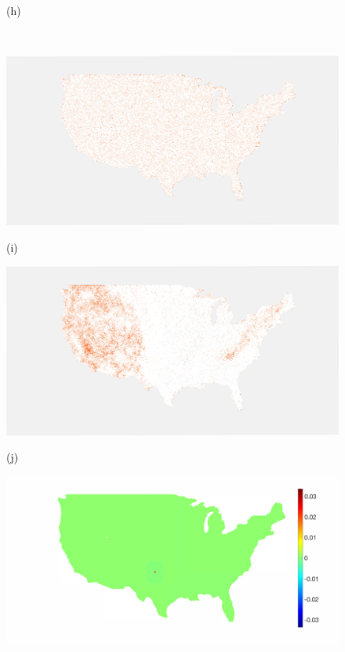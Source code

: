 \documentclass[journal, 10pt]{IEEEtran}
\begin{document}
\begin{figure}[tb]
\begin{minipage}[m]{0.24\linewidth}
\centerline{\small{(h)}}
\end{minipage} \medskip  \\
\begin{minipage}[m]{0.24\linewidth}
\centerline{\includegraphics[width=.94\linewidth]{fig_temp_selected_b2}}
\centerline{\small{(i)}}
\end{minipage}%
\begin{minipage}[m]{0.24\linewidth}
\centerline{\includegraphics[width=.95\linewidth]{fig_temp_selected_b2_adapted}}
\centerline{\small{(j)}}
\end{minipage}
\begin{minipage}[m]{0.24\linewidth}
\centerline{\includegraphics[width=1\linewidth]{fig_temp_scaling}}

\end{minipage}
\end{figure}
\end{document}
